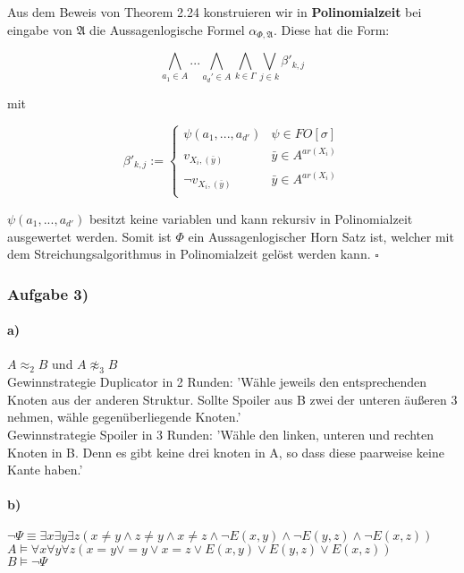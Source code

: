 \documentclass[12pt]{article}
\begin{document}
Aus dem Beweis von Theorem 2.24 konstruieren wir in \textbf{Polinomialzeit} bei eingabe von $\mathfrak{A}$ die Aussagenlogische Formel $\alpha_{\Phi,\mathfrak{A}}$. Diese hat die Form:

\[ \bigwedge_{a_1\in A}... \bigwedge_{a_d'\in A} \bigwedge_{k\in \Gamma} \bigvee_{j\in k} \beta'_{k,j} \] 

mit 

\[ \beta'_{k,j} := 
  \begin{cases}
    \psi(a_1,...,a_{d'}) & \psi\in FO[\sigma]\\
    v_{X_i,(\bar y)} & \bar y \in A^{ar(X_i)} \\
    \neg v_{X_i,(\bar y)} & \bar y \in A^{ar(X_i)} \\
  \end{cases}
\] 

$ \psi(a_1,...,a_{d'}) $ besitzt keine variablen und kann rekursiv in Polinomialzeit ausgewertet werden.
Somit ist $\Phi$ ein Aussagenlogischer Horn Satz ist, welcher mit dem Streichungsalgorithmus in Polinomialzeit gelöst werden kann.
$\square$

\subsubsection*{Aufgabe 3)}
 \paragraph{a)}
 $A \approx_2 B$ und $A \not\approx_3 B$ \\
 Gewinnstrategie Duplicator in 2 Runden: 'Wähle jeweils den entsprechenden Knoten aus der anderen Struktur. Sollte Spoiler aus B zwei der unteren äußeren 3 nehmen, wähle gegenüberliegende Knoten.'\\
 Gewinnstrategie Spoiler in 3 Runden: 'Wähle den linken, unteren und rechten Knoten in B. Denn es gibt keine drei knoten in A, so dass diese paarweise keine Kante haben.'
 
 \paragraph{b)}
 $\neg \Psi \equiv \exists x \exists y \exists z (x \neq y \land z\neq y \land x \neq z \land 
 \neg E(x,y) \land 
 \neg E(y,z) \land 
 \neg E(x,z))$ \\
 $ A \models \forall x \forall y \forall z (x = y \lor = y \lor x = z \lor 
  E(x,y) \lor 
  E(y,z) \lor 
  E(x,z))$ \\
 $ B \models \neg \Psi $
\end{document}
